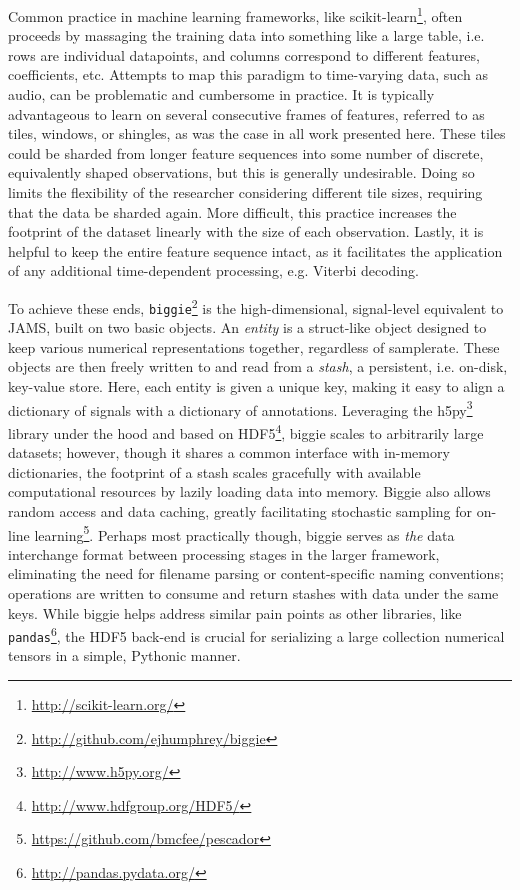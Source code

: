 Common practice in machine learning frameworks, like scikit-learn\footnote{\url{http://scikit-learn.org/}}, often proceeds by massaging the training data into something like a large table, i.e. rows are individual datapoints, and columns correspond to different features, coefficients, etc.
Attempts to map this paradigm to time-varying data, such as audio, can be problematic and cumbersome in practice.
It is typically advantageous to learn on several consecutive frames of features, referred to as tiles, windows, or shingles, as was the case in all work presented here.
These tiles could be sharded from longer feature sequences into some number of discrete, equivalently shaped observations, but this is generally undesirable.
Doing so limits the flexibility of the researcher considering different tile sizes, requiring that the data be sharded again.
More difficult, this practice increases the footprint of the dataset linearly with the size of each observation.
Lastly, it is helpful to keep the entire feature sequence intact, as it facilitates the application of any additional time-dependent processing, e.g. Viterbi decoding.

To achieve these ends, \texttt{biggie}\footnote{\url{http://github.com/ejhumphrey/biggie}} is the high-dimensional, signal-level equivalent to JAMS, built on two basic objects.
An \emph{entity} is a struct-like object designed to keep various numerical representations together, regardless of samplerate.
These objects are then freely written to and read from a \emph{stash}, a persistent, i.e. on-disk, key-value store.
Here, each entity is given a unique key, making it easy to align a dictionary of signals with a dictionary of annotations.
Leveraging the h5py\footnote{\url{http://www.h5py.org/}} library under the hood and based on HDF5\footnote{\url{http://www.hdfgroup.org/HDF5/}}, biggie scales to arbitrarily large datasets;
however, though it shares a common interface with in-memory dictionaries, the footprint of a stash scales gracefully with available computational resources by lazily loading data into memory.
Biggie also allows random access and data caching, greatly facilitating stochastic sampling for on-line learning\footnote{\url{https://github.com/bmcfee/pescador}}.
Perhaps most practically though, biggie serves as \emph{the} data interchange format between processing stages in the larger framework, eliminating the need for filename parsing or content-specific naming conventions; operations are written to consume and return stashes with data under the same keys.
While biggie helps address similar pain points as other libraries, like \texttt{pandas}\footnote{\url{http://pandas.pydata.org/}}, the HDF5 back-end is crucial for serializing a large collection numerical tensors in a simple, Pythonic manner.


